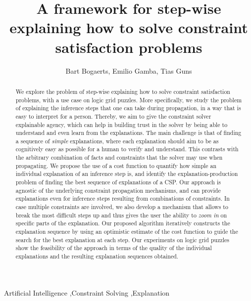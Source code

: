 \documentclass[3p]{elsarticle}
\begin{document}
\begin{frontmatter}

\title{A framework for step-wise explaining how to solve constraint satisfaction problems}

\author[mymainaddress]{Bart Bogaerts, Emilio Gamba, Tias Guns}
\address{Vrije Universiteit Brussel, Pleinlaan 2, 1050 Brussel, Belgium}

\begin{abstract}
We explore the problem of step-wise explaining how to solve constraint
satisfaction problems, with a use case on logic grid puzzles. More specifically,
we study the problem of explaining the inference steps that one can take
during propagation, in a way that is easy to interpret for a person. Thereby,
we aim to give the constraint solver explainable agency, which can help
in building trust in the solver by being able to understand and even learn
from the explanations. The main challenge is that of finding a sequence
of \textit{simple} explanations, where each explanation should aim to be
as cognitively easy as possible for a human to verify and understand. This
contrasts with the arbitrary combination of facts and constraints that
the solver may use when propagating. We propose the use of a cost function
to quantify how simple an individual explanation of an inference step is,
and identify the explanation-production problem of finding the best sequence
of explanations of a CSP. Our approach is agnostic of the underlying constraint
propagation mechanisms, and can provide explanations even for inference
steps resulting from combinations of constraints. In case multiple constraints
are involved, we also develop a mechanism that allows to break the most
difficult steps up and thus gives the user the ability to
\emph{zoom in} on specific parts of the explanation. Our proposed algorithm
iteratively constructs the explanation sequence by using an optimistic
estimate of the cost function to guide the search for the best explanation
at each step. Our experiments on logic grid puzzles show the feasibility
of the approach in terms of the quality of the individual explanations
and the resulting explanation sequences obtained.
\end{abstract}

\begin{keyword}
Artificial Intelligence \sep Constraint Solving \sep Explanation
\end{keyword}

\end{frontmatter}
\end{document}
